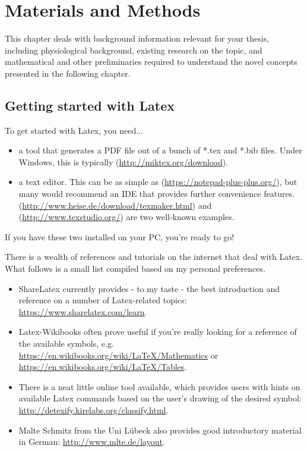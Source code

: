 \chapter{Materials and Methods}
\label{chap:materials-and-methods}

This chapter deals with background information relevant for your thesis, including physiological background, existing research on the topic, and mathematical and other preliminaries required to understand the novel concepts presented in the following chapter.


\section{Getting started with Latex}
\label{sec:getting-started-with}

To get started with Latex, you need...
\begin{itemize}
\item a tool that generates a PDF file out of a bunch of *.tex and *.bib files.
Under Windows, this is typically  (\url{http://miktex.org/download}).
\item a text editor. This can be as simple as (\url{https://notepad-plus-plus.org/}), but many would recommend an IDE that provides further convenience features. (\url{http://www.heise.de/download/texmaker.html}) and (\url{http://www.texstudio.org/}) are two well-known examples.
\end{itemize}
If you have these two installed on your PC, you're ready to go!

There is a wealth of references and tutorials on the internet that deal with Latex.
What follows is a small list compiled based on my personal preferences.
\begin{itemize}
\item ShareLatex currently provides - to my taste - the best introduction and reference on a number of Latex-related topics: \url{https://www.sharelatex.com/learn}.
\item Latex-Wikibooks often prove useful if you're really looking for a reference of the available symbols, e.g. \url{https://en.wikibooks.org/wiki/LaTeX/Mathematics} or \url{https://en.wikibooks.org/wiki/LaTeX/Tables}.
\item There is a neat little online tool available, which provides users with hints on available Latex commands based on the user's drawing of the desired symbol: \url{http://detexify.kirelabs.org/classify.html}.
\item Malte Schmitz from the Uni Lübeck also provides good introductory material in German: \url{http://www.mlte.de/layout}.
\end{itemize}

